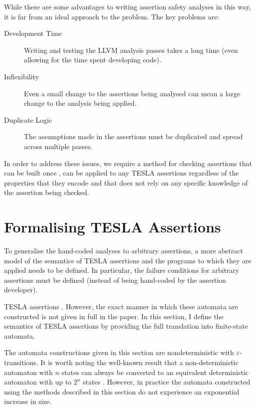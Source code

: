 While there are some advantages to writing assertion safety analyses in
this way, it is far from an ideal approach to the problem. The key
problems are:
\begin{description}
  \item[Development Time] Writing and testing the LLVM analysis passes takes a
    long time (even allowing for the time spent developing
     code).
  \item[Inflexibility] Even a small change to the assertions being
    analysed can mean a large change to the analysis being applied.
  \item[Duplicate Logic] The assumptions made in the assertions must be
    duplicated and spread across multiple passes.
\end{description}

In order to address these issues, we require a method for checking
assertions that can be built once , can be applied
to any TESLA assertions regardless of the properties that they encode
and that does not rely on any specific knowledge of the assertion being
checked.

\section{Formalising TESLA Assertions} \label{sec:formal}

To generalise the hand-coded analyses to arbitrary assertions, a more abstract
model of the semantics of TESLA assertions and the programs to which they are
applied needs to be defined. In particular, the failure conditions for arbitrary
assertions must be defined (instead of being hand-coded by the assertion
developer).

TESLA assertions . However, the exact manner in which these automata are constructed is
not given in full in the paper. In this section, I define the semantics of TESLA
assertions by providing the full translation into finite-state automata.

The automata constructions given in this section are nondeterministic with
$\varepsilon$-transitions. It is worth noting the well-known result that a
non-deterministic automaton with $n$ states can always be converted to an
equivalent deterministic automaton with up to $2^n$ states
\cite{rabin_finite_1959}. However, in practice the automata constructed using
the methods described in this section do not experience an exponential increase
in size.

